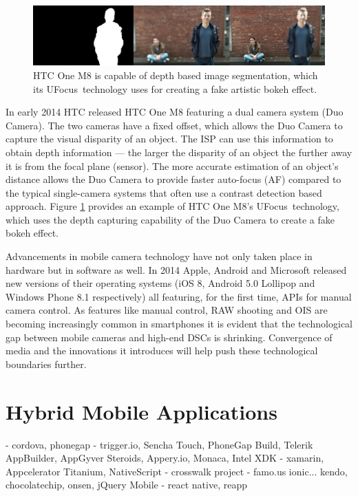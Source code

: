\documentclass[thesis.tex]{subfiles}
\begin{document}
\begin{figure}[ht]
\centering \includegraphics[width=\textwidth]{images/htc-ufocus.jpg}
\caption{HTC One M8 is capable of depth based image segmentation, which its UFocus\texttrademark\ technology uses for creating a fake artistic bokeh effect.\label{figure:htc-ufocus}}
\end{figure}

In early 2014 HTC released HTC One M8 featuring a dual camera system (Duo Camera). The two cameras have a fixed offset, which allows the Duo Camera to capture the visual disparity of an object. The ISP can use this information to obtain depth information --- the larger the disparity of an object the further away it is from the focal plane (sensor). The more accurate estimation of an object's distance allows the Duo Camera to provide faster auto-focus (AF) compared to the typical single-camera systems that often use a contrast detection based approach. Figure \ref{figure:htc-ufocus} provides an example of HTC One M8's UFocus\texttrademark\ technology, which uses the depth capturing capability of the Duo Camera to create a fake bokeh effect.

Advancements in mobile camera technology have not only taken place in hardware but in software as well. In 2014 Apple, Android and Microsoft released new versions of their operating systems (iOS 8, Android 5.0 Lollipop and Windows Phone 8.1 respectively) all featuring, for the first time, APIs for manual camera control. As features like manual control, RAW shooting and OIS are becoming increasingly common in smartphones it is evident that the technological gap between mobile cameras and high-end DSCs is shrinking. Convergence of media and the innovations it introduces will help push these technological boundaries further.

\section{Hybrid Mobile Applications}

- cordova, phonegap
- trigger.io, Sencha Touch, PhoneGap Build, Telerik AppBuilder, AppGyver Steroids, Appery.io, Monaca, Intel XDK
- xamarin, Appcelerator Titanium, NativeScript
- crosswalk project
- famo.us ionic... kendo, chocolatechip, onsen, jQuery Mobile
- react native, reapp
\end{document}
